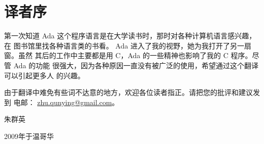 \chapter{译者序}
\pagestyle{empty}

第一次知道 Ada 这个程序语言是在大学读书时，那时对各种计算机语言感兴趣，在
图书馆里找各种语言类的书看。 Ada 进入了我的视野，她为我打开了另一扇窗。虽然
其后的工作中主要都是用 C，Ada 的一些精神也影响了我的 C 程序。尽管 Ada 的功能
很强大，因为各种原因一直没有被广泛的使用，希望通过这个翻译可以引起更多人
的兴趣。

由于翻译中难免有些词不达意的地方，欢迎各位读者指正。请把您的批评和建议发到
电邮： \url{zhu.qunying@gmail.com}。

\vspace{5em}
\begin{flushright}
朱群英

2009年于温哥华
\end{flushright}



